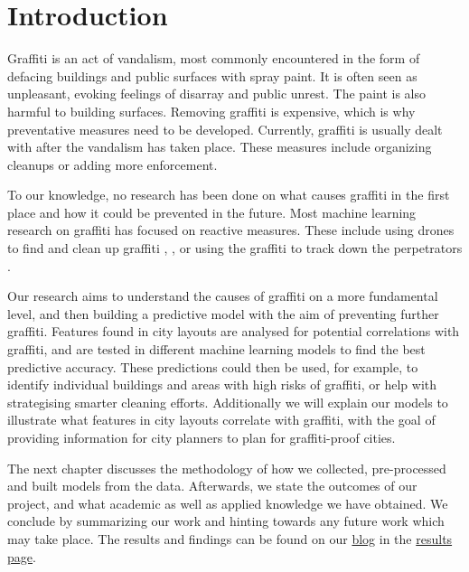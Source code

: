 \chapter{Introduction}


Graffiti is an act of vandalism, most commonly encountered in the form of defacing buildings and public surfaces with spray paint. It is often seen as unpleasant, evoking feelings of disarray and public unrest. The paint is also harmful to building surfaces. Removing graffiti is expensive, which is why preventative measures need to be developed. Currently, graffiti is usually dealt with after the vandalism has taken place. These measures include organizing cleanups or adding more enforcement.

To our knowledge, no research has been done on what causes graffiti in the first place and how it could be prevented in the future. Most machine learning research on graffiti has focused on reactive measures. These include using drones to find and clean up graffiti \cite{uav}, \cite{drone}, or using the graffiti to track down the perpetrators \cite{gang}.

Our research aims to understand the causes of graffiti on a more fundamental level, and then building a predictive model with the aim of preventing further graffiti. Features found in city layouts are analysed for potential correlations with graffiti, and are tested in different machine learning models to find the best predictive accuracy. These predictions could then be used, for example, to identify individual buildings and areas with high risks of graffiti, or help with strategising smarter cleaning efforts. Additionally we will explain our models to illustrate what features in city layouts correlate with graffiti, with the goal of providing information for city planners to plan for graffiti-proof cities.

The next chapter discusses the methodology of how we collected, pre-processed and built models from the data. Afterwards, we state the outcomes of our project, and what academic as well as applied knowledge we have obtained. We conclude by summarizing our work and hinting towards any future work which may take place. The results and findings can be found on our \href{https://cowkeyman.github.io/PredictingGraffitiUsingCityLayouts/}{blog} in the \href{https://cowkeyman.github.io/PredictingGraffitiUsingCityLayouts/results.html}{results page}.
